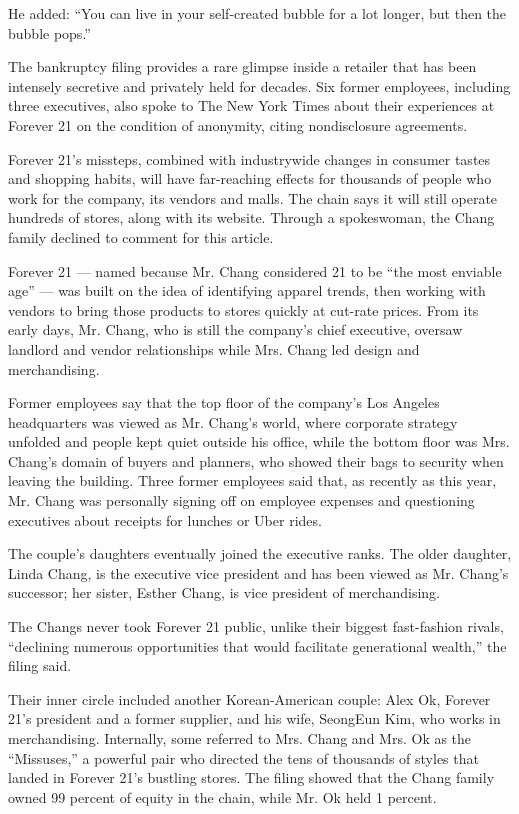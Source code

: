He added: ``You can live in your self-created bubble for a lot longer,
but then the bubble pops.''

The bankruptcy filing provides a rare glimpse inside a retailer that has
been intensely secretive and privately held for decades. Six former
employees, including three executives, also spoke to The New York Times
about their experiences at Forever 21 on the condition of anonymity,
citing nondisclosure agreements.

Forever 21's missteps, combined with industrywide changes in consumer
tastes and shopping habits, will have far-reaching effects for thousands
of people who work for the company, its vendors and malls. The chain
says it will still operate hundreds of stores, along with its website.
Through a spokeswoman, the Chang family declined to comment for this
article.

Forever 21 --- named because Mr. Chang considered 21 to be ``the most
enviable age'' --- was built on the idea of identifying apparel trends,
then working with vendors to bring those products to stores quickly at
cut-rate prices. From its early days, Mr. Chang, who is still the
company's chief executive, oversaw landlord and vendor relationships
while Mrs. Chang led design and merchandising.

Former employees say that the top floor of the company's Los Angeles
headquarters was viewed as Mr. Chang's world, where corporate strategy
unfolded and people kept quiet outside his office, while the bottom
floor was Mrs. Chang's domain of buyers and planners, who showed their
bags to security when leaving the building. Three former employees said
that, as recently as this year, Mr. Chang was personally signing off on
employee expenses and questioning executives about receipts for lunches
or Uber rides.

The couple's daughters eventually joined the executive ranks. The older
daughter, Linda Chang, is the executive vice president and has been
viewed as Mr. Chang's successor; her sister, Esther Chang, is vice
president of merchandising.

The Changs never took Forever 21 public, unlike their biggest
fast-fashion rivals, ``declining numerous opportunities that would
facilitate generational wealth,'' the filing said.

Their inner circle included another Korean-American couple: Alex Ok,
Forever 21's president and a former supplier, and his wife, SeongEun
Kim, who works in merchandising. Internally, some referred to Mrs. Chang
and Mrs. Ok as the ``Missuses,'' a powerful pair who directed the tens
of thousands of styles that landed in Forever 21's bustling stores. The
filing showed that the Chang family owned 99 percent of equity in the
chain, while Mr. Ok held 1 percent.

